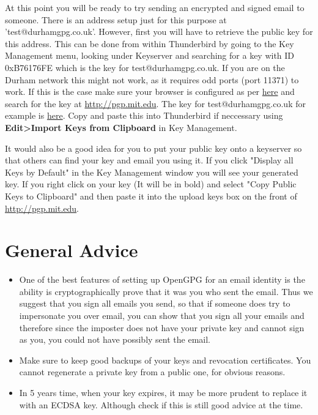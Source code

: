 \begin{compactenum}[1.]
    \item At this point you will be ready to try sending an encrypted and signed email to someone. There is an address setup just for this purpose at 'test@durhamgpg.co.uk'. However, first you will have to retrieve the public key for this address. This can be done from within Thunderbird by going to the Key Management menu, looking under Keyserver and searching for a key with ID 0xB76176FE which is the key for test@durhamgpg.co.uk. If you are on the Durham network this might not work, as it requires odd ports (port 11371) to work. If this is the case make sure your browser is configured as per \href{http://durhamgpg.co.uk/ffproxy.png}{here} and search for the key at \href{http://pgp.mit.edu}{http://pgp.mit.edu}. The key for test@durhamgpg.co.uk for example is \href{http://pgp.mit.edu:11371/pks/lookup?op=get&search=0x773B90C7B76176FE}{here}. Copy and paste this into Thunderbird if neccessary using \textbf{Edit>Import Keys from Clipboard} in Key Management.
    \item It would also be a good idea for you to put your public key onto a keyserver so that others can find your key and email you using it. If you click "Display all Keys by Default" in the Key Management window you will see your generated key. If you right click on your key (It will be in bold) and select "Copy Public Keys to Clipboard" and then paste it into the upload keys box on the front of \href{http://pgp.mit.edu}{http://pgp.mit.edu}.
\end{compactenum}

\section{General Advice}

\begin{itemize}
    \item One of the best features of setting up OpenGPG for an email identity is the ability is cryptographically prove that it was you who sent the email. Thus we suggest that you sign all emails you send, so that if someone does try to impersonate you over email, you can show that you sign all your emails and therefore since the imposter does not have your private key and cannot sign as you, you could not have possibly sent the email.
    \item Make sure to keep good backups of your keys and revocation certificates. You cannot regenerate a private key from a public one, for obvious reasons.
    \item In 5 years time, when your key expires, it may be more prudent to replace it with an ECDSA key. Although check if this is still good advice at the time.
\end{itemize}

